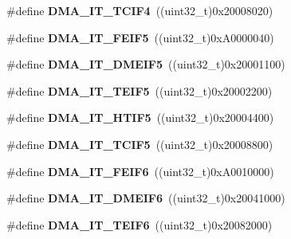 \begin{DoxyCompactItemize}
\#define {\bfseries D\+M\+A\+\_\+\+I\+T\+\_\+\+T\+C\+I\+F4}~((uint32\+\_\+t)0x20008020)
\item 
\mbox{\label{group___d_m_a__interrupts__definitions_ga8b63b126eedeeed93051abfe943c7a4a}} 
\#define {\bfseries D\+M\+A\+\_\+\+I\+T\+\_\+\+F\+E\+I\+F5}~((uint32\+\_\+t)0x\+A0000040)
\item 
\mbox{\label{group___d_m_a__interrupts__definitions_ga03c884977c9eac6b98c33707df72f1de}} 
\#define {\bfseries D\+M\+A\+\_\+\+I\+T\+\_\+\+D\+M\+E\+I\+F5}~((uint32\+\_\+t)0x20001100)
\item 
\mbox{\label{group___d_m_a__interrupts__definitions_ga954167a7b1f01653ca891a1e2f5fc2ef}} 
\#define {\bfseries D\+M\+A\+\_\+\+I\+T\+\_\+\+T\+E\+I\+F5}~((uint32\+\_\+t)0x20002200)
\item 
\mbox{\label{group___d_m_a__interrupts__definitions_gab67a2a189e63786b23e37febcd9aaad1}} 
\#define {\bfseries D\+M\+A\+\_\+\+I\+T\+\_\+\+H\+T\+I\+F5}~((uint32\+\_\+t)0x20004400)
\item 
\mbox{\label{group___d_m_a__interrupts__definitions_gaf4a7f8f3d5914858c59b12fc36e9a176}} 
\#define {\bfseries D\+M\+A\+\_\+\+I\+T\+\_\+\+T\+C\+I\+F5}~((uint32\+\_\+t)0x20008800)
\item 
\mbox{\label{group___d_m_a__interrupts__definitions_gad023ccedd5283ace18de6d0bcac06e0a}} 
\#define {\bfseries D\+M\+A\+\_\+\+I\+T\+\_\+\+F\+E\+I\+F6}~((uint32\+\_\+t)0x\+A0010000)
\item 
\mbox{\label{group___d_m_a__interrupts__definitions_ga154421000068d646b9403303aeae09e8}} 
\#define {\bfseries D\+M\+A\+\_\+\+I\+T\+\_\+\+D\+M\+E\+I\+F6}~((uint32\+\_\+t)0x20041000)
\item 
\mbox{\label{group___d_m_a__interrupts__definitions_gab1c3b881dd5493dee96b49f4ddbb7204}} 
\#define {\bfseries D\+M\+A\+\_\+\+I\+T\+\_\+\+T\+E\+I\+F6}~((uint32\+\_\+t)0x20082000)
\item 

\end{DoxyCompactItemize}
